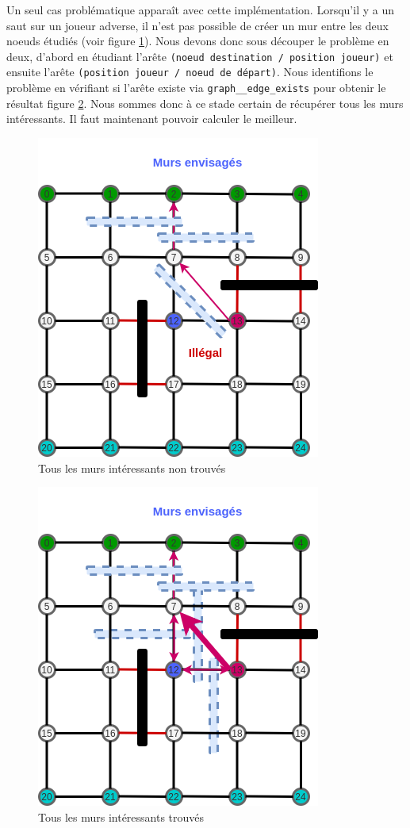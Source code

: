 \documentclass[a4paper]{article}
\begin{document}
\begin{enumerate}
Un seul cas problématique apparaît avec cette implémentation. Lorsqu'il y a un saut sur un joueur adverse, il n'est pas possible de créer un mur entre les deux noeuds étudiés (voir figure \ref{fig:cut_path6}). Nous devons donc sous découper le problème en deux, d'abord en étudiant l'arête \texttt{(noeud destination / position joueur)} et ensuite l'arête \texttt{(position joueur / noeud de départ)}.  Nous identifions le problème en vérifiant si l'arête existe via \texttt{graph\_\_edge\_exists} pour obtenir le résultat figure \ref{fig:cut_path7}. Nous sommes donc à ce stade certain de récupérer tous les murs intéressants. Il faut maintenant pouvoir calculer le meilleur. \\

\clearpage
\begin{figure}[ht!]
    \centering
    \includegraphics[scale=0.7]{cut_path6.png}
    \caption{Tous les murs intéressants non trouvés}
    \label{fig:cut_path6}
\end{figure}

\begin{figure}[ht!]
    \centering
    \includegraphics[scale=0.7]{cut_path7.png}
    \caption{Tous les murs intéressants trouvés}
    \label{fig:cut_path7}
\end{figure}


\end{enumerate}
\end{document}
